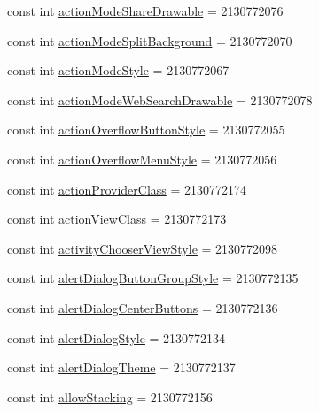 \begin{CompactItemize}
\item 
const int \hyperlink{class__2doo_1_1_droid_1_1_resource_1_1_attribute_cd007809c7815bfe0883ac9fa757de2f}{actionModeShareDrawable} = 2130772076
\item 
const int \hyperlink{class__2doo_1_1_droid_1_1_resource_1_1_attribute_64cfc2d1ea9f4c3f663576bd4e1627d4}{actionModeSplitBackground} = 2130772070
\item 
const int \hyperlink{class__2doo_1_1_droid_1_1_resource_1_1_attribute_14d2c7eb2ba42b74a8c319287c99586b}{actionModeStyle} = 2130772067
\item 
const int \hyperlink{class__2doo_1_1_droid_1_1_resource_1_1_attribute_da2c895106a068c211f06c32de13f67a}{actionModeWebSearchDrawable} = 2130772078
\item 
const int \hyperlink{class__2doo_1_1_droid_1_1_resource_1_1_attribute_5e68d80237718e5d8939d148ffd82835}{actionOverflowButtonStyle} = 2130772055
\item 
const int \hyperlink{class__2doo_1_1_droid_1_1_resource_1_1_attribute_d0e7a728f62efe9fbfed895fff6c3aa9}{actionOverflowMenuStyle} = 2130772056
\item 
const int \hyperlink{class__2doo_1_1_droid_1_1_resource_1_1_attribute_84175820713be0f9218346d5b70f70b1}{actionProviderClass} = 2130772174
\item 
const int \hyperlink{class__2doo_1_1_droid_1_1_resource_1_1_attribute_62258d76093aaca263d08bcb520032e3}{actionViewClass} = 2130772173
\item 
const int \hyperlink{class__2doo_1_1_droid_1_1_resource_1_1_attribute_069ce81f8106c4b1300ec1f78b4c1a18}{activityChooserViewStyle} = 2130772098
\item 
const int \hyperlink{class__2doo_1_1_droid_1_1_resource_1_1_attribute_15ec19478c89be89faf3753dfa9542f4}{alertDialogButtonGroupStyle} = 2130772135
\item 
const int \hyperlink{class__2doo_1_1_droid_1_1_resource_1_1_attribute_5906e76ceae4beb74331c502a0d932bd}{alertDialogCenterButtons} = 2130772136
\item 
const int \hyperlink{class__2doo_1_1_droid_1_1_resource_1_1_attribute_fe9d3440cffab74f8218d2fbbae546a4}{alertDialogStyle} = 2130772134
\item 
const int \hyperlink{class__2doo_1_1_droid_1_1_resource_1_1_attribute_93d9e31d4a976a9db5f426a26735248f}{alertDialogTheme} = 2130772137
\item 
const int \hyperlink{class__2doo_1_1_droid_1_1_resource_1_1_attribute_f977fb44f18bc85a2e86c44c6747d7a0}{allowStacking} = 2130772156

\end{CompactItemize}
